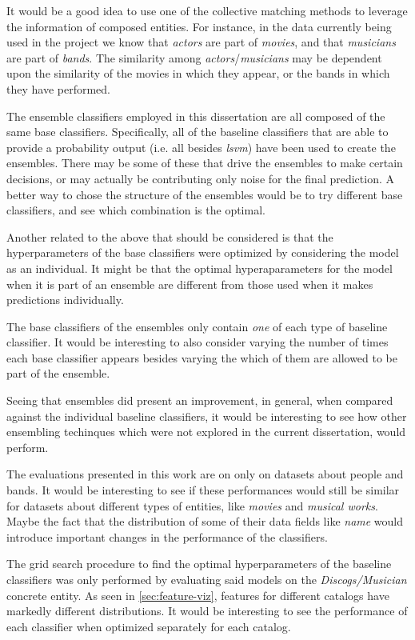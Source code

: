 \documentclass[epsfig,a4paper,11pt,titlepage,twoside,openany]{book}
\begin{document}
It would be a good idea to use one of the collective matching methods to leverage the information of composed entities. For instance, in the data currently being used in the project we know that \textit{actors} are part of \textit{movies}, and that \textit{musicians} are part of \textit{bands}. The similarity among \textit{actors}/\textit{musicians} may be dependent upon the similarity of the movies in which they appear, or the bands in which they have performed.

The ensemble classifiers employed in this dissertation are all composed of the same base classifiers. Specifically, all of the baseline classifiers that are able to provide a probability output (i.e. all besides \textit{lsvm}) have been used to create the ensembles. There may be some of these that drive the ensembles to make certain decisions, or may actually be contributing only noise for the final prediction. A better way to chose the structure of the ensembles would be to try different base classifiers, and see which combination is the optimal. 

Another related to the above that should be considered is that the hyperparameters of the base classifiers were optimized by considering the model as an individual. It might be that the optimal hyperaparameters for the model when it is part of an ensemble are different from those used when it makes predictions individually. 

The base classifiers of the ensembles only contain \textit{one} of each type of baseline classifier. It would be interesting to also consider varying the number of times each base classifier appears besides varying the which of them are allowed to be part of the ensemble. 

Seeing that ensembles did present an improvement, in general, when compared against the individual baseline classifiers, it would be interesting to see how other ensembling techinques which were not explored in the current dissertation, would perform.

The evaluations presented in this work are on only on datasets about people and bands. It would be interesting to see if these performances would still be similar for datasets about different types of entities, like \textit{movies} and \textit{musical works}. Maybe the fact that the distribution of some of their data fields like \textit{name} would introduce important changes in the performance of the classifiers. 

The grid search procedure to find the optimal hyperparameters of the baseline classifiers was only performed by evaluating said models on the \textit{Discogs/Musician} concrete entity. As seen in \autoref{sec:feature-viz}, features for different catalogs have markedly different distributions. It would be interesting to see the performance of each classifier when optimized separately for each catalog. 
\end{document}
